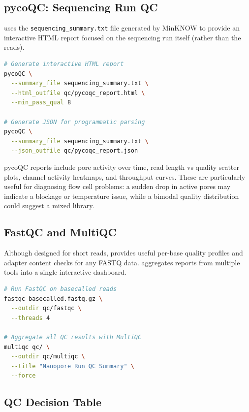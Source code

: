 \subsection{pycoQC: Sequencing Run QC}
\label{subsec:diyanalysis:pycoqc}

 uses the \texttt{sequencing\_summary.txt} file generated by MinKNOW to provide an interactive HTML report focused on the sequencing run itself (rather than the reads).

\begin{lstlisting}[language=bash,caption={Running pycoQC for run-level quality control.},label=lst:diy-pycoqc]
# Generate interactive HTML report
pycoQC \
  --summary_file sequencing_summary.txt \
  --html_outfile qc/pycoqc_report.html \
  --min_pass_qual 8

# Generate JSON for programmatic parsing
pycoQC \
  --summary_file sequencing_summary.txt \
  --json_outfile qc/pycoqc_report.json
\end{lstlisting}

pycoQC reports include pore activity over time, read length vs quality scatter plots, channel activity heatmaps, and throughput curves. These are particularly useful for diagnosing flow cell problems: a sudden drop in active pores may indicate a blockage or temperature issue, while a bimodal quality distribution could suggest a mixed library.

\subsection{FastQC and MultiQC}
\label{subsec:diyanalysis:fastqc}

Although designed for short reads, \software{FastQC} provides useful per-base quality profiles and adapter content checks for any \acrshort{FASTQ} data. \software{MultiQC} aggregates reports from multiple tools into a single interactive dashboard.

\begin{lstlisting}[language=bash,caption={Running FastQC and MultiQC.},label=lst:diy-fastqc]
# Run FastQC on basecalled reads
fastqc basecalled.fastq.gz \
  --outdir qc/fastqc \
  --threads 4

# Aggregate all QC results with MultiQC
multiqc qc/ \
  --outdir qc/multiqc \
  --title "Nanopore Run QC Summary" \
  --force
\end{lstlisting}

\subsection{QC Decision Table}
\label{subsec:diyanalysis:qc_decision}

